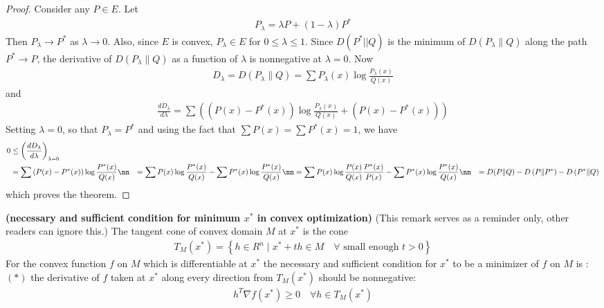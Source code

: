 \documentclass{article}
\newcommand{\bfs}[1]{\textbf{({#1})}}
\begin{document}
\begin{proof}
 Consider any $P \in E$. Let
\begin{align*}
P_{\lambda}=\lambda P+(1-\lambda) P^{*}
\end{align*}
Then $P_{\lambda} \rightarrow P^{*}$ as $\lambda \rightarrow 0$. Also, since $E$ is convex, $P_{\lambda} \in E$ for $0 \leq \lambda \leq 1$. Since $D\left(P^{*}|| Q\right)$ is the minimum of $D\left(P_{\lambda} \| Q\right)$ along the path $P^{*} \rightarrow P$, the derivative of $D\left(P_{\lambda} \| Q\right)$ as a function of $\lambda$ is nonnegative at $\lambda=0$. Now
\begin{align*}
D_{\lambda}=D\left(P_{\lambda} \| Q\right)=\sum P_{\lambda}(x) \log \frac{P_{\lambda}(x)}{Q(x)}
\end{align*}
and
\begin{align*}
\frac{d D_{\lambda}}{d \lambda}=\sum\left(\left(P(x)-P^{*}(x)\right) \log \frac{P_{\lambda}(x)}{Q(x)}+\left(P(x)-P^{*}(x)\right)\right)
\end{align*}
Setting $\lambda=0$, so that $P_{\lambda}=P^{*}$ and using the fact that $\sum P(x)=\sum P^{*}(x)=1$, we have
\begin{align}
0 & \leq\left(\frac{d D_{\lambda}}{d \lambda}\right)_{\lambda=0} \label{clt:eq1}\\
&=\sum\left(P(x)-P^{*}(x)\right) \log \frac{P^{*}(x)}{Q(x)} \nn
&=\sum P(x) \log \frac{P^{*}(x)}{Q(x)}-\sum P^{*}(x) \log \frac{P^{*}(x)}{Q(x)} \nn
&=\sum P(x) \log \frac{P(x)}{Q(x)} \frac{P^{*}(x)}{P(x)}-\sum P^{*}(x) \log \frac{P^{*}(x)}{Q(x)} \nn
&=D(P \| Q)-D\left(P \| P^{*}\right)-D\left(P^{*} \| Q\right)
\end{align}
which proves the theorem.
\end{proof}
\begin{rema}{\bfs{necessary and sufficient condition for minimum $x^{*}$ in convex optimization}}\label{clt:rem5}
(This remark serves as a reminder only, other readers can ignore this.) The tangent cone of convex domain $M$ at $x^{*}$ is the cone
\begin{align*}
T_{M}\left(x^{*}\right)=\left\{h \in R ^{n} \mid x^{*}+t h \in M \quad \forall \text { small enough } t>0\right\}
\end{align*}
For the  convex  function $f$ on $M$ which is differentiable at $x^{*}$ the necessary and sufficient condition for $x^{*}$ to be a minimizer of $f$ on $M$ is :
$(*)$ the derivative of $f$ taken at $x^{*}$ along every direction from $T_{M}\left(x^{*}\right)$ should be nonnegative:
\begin{align*}
h^{T} \nabla f\left(x^{*}\right) \geq 0 \quad \forall h \in T_{M}\left(x^{*}\right)
\end{align*}
\end{rema}
\end{document}
